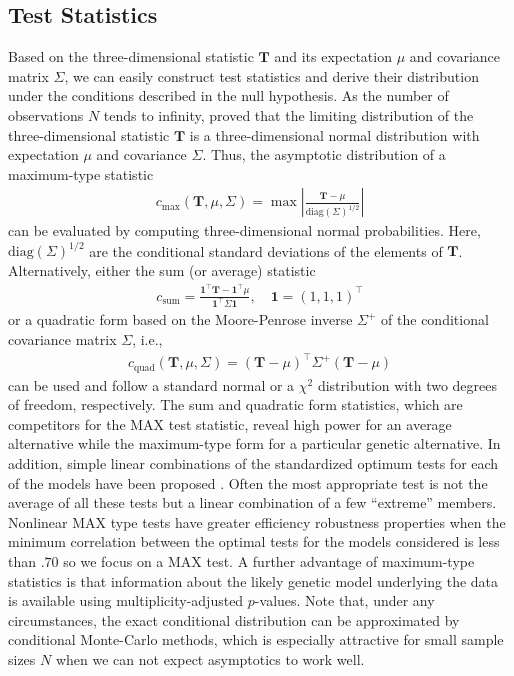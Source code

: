 \documentclass[bimj,fleqn]{w-art}
\newcommand{\T}{\mathbf{T}}
\begin{document}
\subsection{Test Statistics}

Based on the three-dimensional statistic $\T$ and its expectation 
$\mu$ and covariance matrix $\Sigma$, we can easily construct test 
statistics and derive their distribution under the conditions
described in the null hypothesis. As the number of observations 
$N$ tends to infinity, \citet{StrasserWeber1999}
proved that the limiting distribution of the three-dimensional 
statistic $\T$ is a three-dimensional normal distribution with 
expectation $\mu$ and covariance $\Sigma$. Thus, the asymptotic distribution
of a maximum-type statistic
\begin{eqnarray*}
c_\text{max}(\T, \mu, \Sigma)  = \max \left| \frac{\T - \mu}{\text{diag}(\Sigma)^{1/2}} \right|
\end{eqnarray*}
can be evaluated by computing three-dimensional normal probabilities. Here,
$\text{diag}(\Sigma)^{1/2}$ are the conditional standard deviations of
the elements of $\T$. Alternatively, either the sum (or average) statistic
\begin{eqnarray*}
c_\text{sum} = \frac{\mathbf{1}^\top \T - \mathbf{1}^\top\mu}{\mathbf{1}^\top \Sigma \mathbf{1}}, \quad \mathbf{1} = (1, 1, 1)^\top
\end{eqnarray*}
or a quadratic form 
based on the Moore-Penrose inverse $\Sigma^+$ of the conditional covariance
matrix $\Sigma$, i.e.,
\begin{eqnarray*}
c_\text{quad}(\T, \mu, \Sigma)  = (\T - \mu)^\top \Sigma^+ (\T - \mu)
\end{eqnarray*}
can be used and 
follow a standard normal or a $\chi^2$ distribution with two degrees of freedom, respectively. 
The sum and quadratic form statistics, which are competitors for the MAX 
test statistic, reveal high power for an average alternative while the maximum-type 
form for a particular genetic alternative.
In addition, simple linear combinations of the standardized optimum tests for each of
the models have been proposed \cite{Gastwirth:1985}. Often the most appropriate test is not the
average of all these tests but a linear combination of a few ``extreme'' members. Nonlinear
MAX type tests have greater efficiency robustness properties when the minimum
correlation between the optimal tests for the models considered is less than $.70$ 
\cite{Freidlin+Podgor+Gastwirth:1999} so we focus on a MAX test. A further advantage of 
maximum-type statistics is that information about the likely genetic model underlying the data 
is available using multiplicity-adjusted $p$-values.
Note that, under any circumstances, the exact conditional distribution 
can be approximated by conditional Monte-Carlo methods, which is especially 
attractive for small sample sizes $N$ when we can not expect asymptotics 
to work well.
\end{document}
